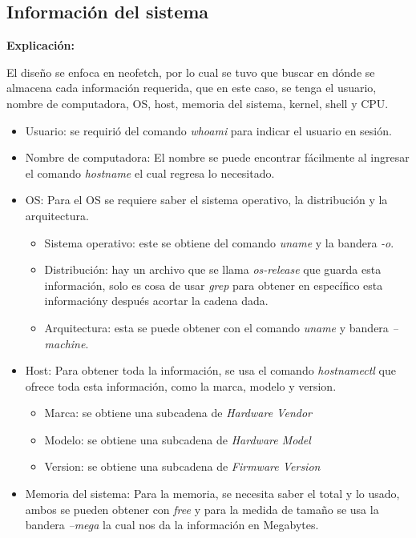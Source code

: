 \documentclass[letter,12pt]{article} %
\begin{document}
\subsection{Información del sistema}
\textbf{Explicación:}\par
\vspace{0.3cm}
El diseño se enfoca en neofetch, por lo cual se tuvo que buscar en dónde se almacena cada información requerida, que en este caso, se tenga el usuario, nombre de computadora, OS, host, memoria del sistema, kernel, shell y CPU. 
\begin{itemize}
    \item Usuario: se requirió del comando \textit{whoami} para indicar el usuario en sesión.
    \item Nombre de computadora: El nombre se puede encontrar fácilmente al ingresar el comando \textit{hostname} el cual regresa lo necesitado.
    \item OS: Para el OS se requiere saber el sistema operativo, la distribución y la arquitectura.
    \begin{itemize}
        \item Sistema operativo: este se obtiene del comando \textit{uname} y la bandera \textit{-o}.
        \item Distribución: hay un archivo que se llama \textit{os-release} que guarda esta información, solo es cosa de usar \textit{grep} para obtener en específico esta informacióny después acortar la cadena dada.
        \item Arquitectura: esta se puede obtener con el comando \textit{uname} y bandera \textit{--machine}.
    \end{itemize}
    \item Host: Para obtener toda la información, se usa el comando \textit{hostnamectl} que ofrece toda esta información, como la marca, modelo y version.
    \begin{itemize}
        \item Marca: se obtiene una subcadena de \textit{Hardware Vendor}
        \item Modelo: se obtiene una subcadena de \textit{Hardware Model}
        \item Version: se obtiene una subcadena de \textit{Firmware Version}
    \end{itemize}
    \item Memoria del sistema: Para la memoria, se necesita saber el total y lo usado, ambos se pueden obtener con \textit{free} y para la medida de tamaño se usa la bandera \textit{--mega} la cual nos da la información en Megabytes.

\end{itemize}
\end{document}
